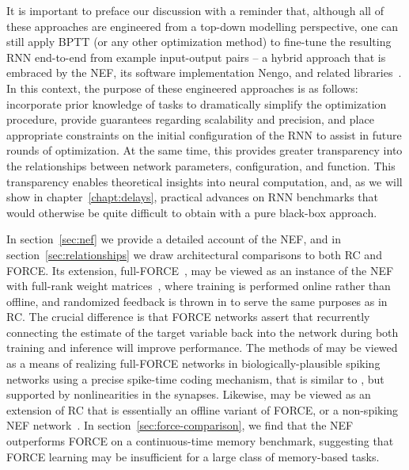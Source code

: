 It is important to preface our discussion with a reminder that, although all of these approaches are engineered from a top-down modelling perspective, one can still apply BPTT (or any other optimization method) to fine-tune the resulting RNN end-to-end from example input-output pairs -- a hybrid approach that is embraced by the NEF, its software implementation Nengo, and related libraries~\citep{rasmussen2018nengodl, hazan2018bindsnet}.
In this context, the purpose of these engineered approaches is as follows: incorporate prior knowledge of tasks to dramatically simplify the optimization procedure, provide guarantees regarding scalability and precision, and place appropriate constraints on the initial configuration of the RNN to assist in future rounds of optimization.
At the same time, this provides greater transparency into the relationships between network parameters, configuration, and function.
This transparency enables theoretical insights into neural computation, and, as we will show in chapter~\ref{chapt:delays}, practical advances on RNN benchmarks that would otherwise be quite difficult to obtain with a pure black-box approach.

In section~\ref{sec:nef} we provide a detailed account of the NEF, and in section~\ref{sec:relationships} we draw architectural comparisons to both RC and FORCE.
Its extension, full-FORCE~\citep{depasquale2018full}, may be viewed as an instance of the NEF with full-rank weight matrices~\citep{tripp2006neural}, where training is performed online rather than offline, and randomized feedback is thrown in to serve the same purposes as in RC.
The crucial difference is that FORCE networks assert that recurrently connecting the estimate of the target variable back into the network during both training and inference will improve performance. 
The methods of \citet{thalmeier2016learning} may be viewed as a means of realizing full-FORCE networks in biologically-plausible spiking networks using a precise spike-time coding mechanism, that is similar to \citet{boerlin2013predictive}, but supported by nonlinearities in the synapses.
Likewise, \citet{jaeger2014controlling} may be viewed as an extension of RC that is essentially an offline variant of FORCE, or a non-spiking NEF network~\citep{aubin2017}.
In section~\ref{sec:force-comparison}, we find that the NEF %
 outperforms FORCE on a continuous-time memory benchmark, suggesting that FORCE learning may be insufficient for a large class of memory-based tasks.


